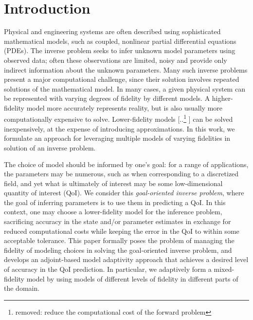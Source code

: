 \documentclass[review]{siamart0516}
\providecommand{\DIFaddtex}[1]{{\protect\color{blue} \sf #1}} %
\providecommand{\DIFdeltex}[1]{{\protect\color{red} [..\footnote{removed: #1} ]}} %
\providecommand{\DIFaddbegin}{} %
\providecommand{\DIFaddend}{} %
\providecommand{\DIFdelbegin}{} %
\providecommand{\DIFdelend}{} %
\providecommand{\DIFadd}[1]{\texorpdfstring{\DIFaddtex{#1}}{#1}} %
\providecommand{\DIFdel}[1]{\texorpdfstring{\DIFdeltex{#1}}{}} %
\newcommand{\DIFscaledelfig}{0.5}
\newlength{\DIFdelgraphicswidth} %
\newlength{\DIFdelgraphicsheight} %
\newcommand{\DIFaddincludegraphics}[2][]{{\color{blue}\fbox{\DIFOincludegraphics[#1]{#2}}}} %
\newcommand{\DIFdelincludegraphics}[2][]{%
\sbox{\DIFdelgraphicsbox}{\DIFOincludegraphics[#1]{#2}}%
\settoboxwidth{\DIFdelgraphicswidth}{\DIFdelgraphicsbox} %
\settoboxtotalheight{\DIFdelgraphicsheight}{\DIFdelgraphicsbox} %
\scalebox{\DIFscaledelfig}{%
\parbox[b]{\DIFdelgraphicswidth}{\usebox{\DIFdelgraphicsbox}\\[-\baselineskip] \rule{\DIFdelgraphicswidth}{0em}}\llap{\resizebox{\DIFdelgraphicswidth}{\DIFdelgraphicsheight}{%
\setlength{\unitlength}{\DIFdelgraphicswidth}%
\begin{picture}(1,1)%
\thicklines\linethickness{2pt} %
{\color[rgb]{1,0,0}\put(0,0){\framebox(1,1){}}}%
{\color[rgb]{1,0,0}\put(0,0){\line( 1,1){1}}}%
{\color[rgb]{1,0,0}\put(0,1){\line(1,-1){1}}}%
\end{picture}%
}\hspace*{3pt}}} %
} %
\DeclareRobustCommand{\DIFaddbegin}{\DIFOaddbegin \let\includegraphics\DIFaddincludegraphics} %
\DeclareRobustCommand{\DIFaddend}{\DIFOaddend \let\includegraphics\DIFOincludegraphics} %
\DeclareRobustCommand{\DIFdelbegin}{\DIFOdelbegin \let\includegraphics\DIFdelincludegraphics} %
\DeclareRobustCommand{\DIFdelend}{\DIFOaddend \let\includegraphics\DIFOincludegraphics} %
\begin{document}
\section{Introduction}

Physical and engineering systems are often described using sophisticated mathematical models, such as coupled, nonlinear partial differential equations (PDEs). The inverse problem seeks to infer unknown model parameters using observed data; often these observations are limited, noisy and provide only indirect information about the unknown parameters. %
Many such inverse problems present a major computational challenge, since their solution involves repeated solutions of the mathematical model. In many cases, a given physical system can be represented with varying degrees of fidelity by different models. A higher-fidelity model more accurately represents reality, but is also usually more computationally expensive to solve. Lower-fidelity models \DIFdelbegin \DIFdel{reduce the computational cost of the forward problem}\DIFdelend \DIFaddbegin \DIFadd{can be solved inexpensively}\DIFaddend , at the expense of introducing approximations. In this work, we formulate an approach for leveraging multiple models of varying fidelities in solution of an inverse problem.

The choice of model should be informed by one's goal: for a range of applications, the parameters may be numerous, such as when corresponding to a discretized field, and yet what is ultimately of interest may be some low-dimensional quantity of interest (QoI). We consider this \textit{goal-oriented inverse problem}, where the goal of inferring parameters is to use them in predicting a QoI. In this context, one may choose a lower-fidelity model for the inference problem, sacrificing accuracy in the state and/or parameter estimates in exchange for reduced computational costs while keeping the error in the QoI to within some acceptable tolerance.  This paper formally poses the problem of managing the fidelity of modeling choices in solving the goal-oriented inverse problem, and develops an adjoint-based model adaptivity approach that achieves a desired level of accuracy in the QoI prediction. In particular, we adaptively form a mixed-fidelity model by using models of different levels of fidelity in different parts of the domain.
\end{document}

